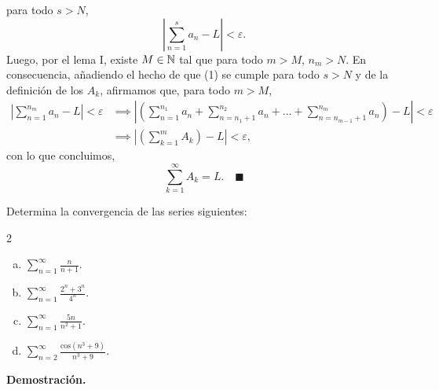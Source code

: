 \documentclass[11pt]{scrartcl}
\begin{document}
para todo $s > N$,
\[
\left|\sum_{n=1}^{s}a_n - L\right| < \varepsilon. \tag{1}
\]
Luego, por el lema I, existe $M \in \mathbb N$ tal que para todo $m > M$, $n_m > N$. En consecuencia, añadiendo el hecho de que
(1) se cumple para todo $s > N$ y de la definición de los $A_k$, afirmamos que, para todo $m > M$,
\begin{align*}
    \left|\sum_{n=1}^{n_m}a_n - L\right| < \varepsilon &\implies \left|\left(\sum_{n=1}^{n_1}a_n + \sum_{n=n_1+1}^{n_2}a_n + ... + \sum_{n=n_{m-1}+1}^{n_m}a_n\right) - L\right| < \varepsilon \\
    &\implies \left|\left(\sum_{k=1}^{m}A_k\right) - L\right| < \varepsilon,
\end{align*}
con lo que concluimos,
\[
\sum_{k=1}^{\infty}A_k = L. \quad \blacksquare
\]
\newpage
\begin{mdframed}[style=mdpurplebox, frametitle={Ejercicio 04, Tarea 10, Cálculo II}]
    Determina la convergencia de las series siguientes: 
    \begin{multicols}{2}
        \begin{enumerate}[(a)]
            \item  $\sum_{n=1}^{\infty}$$\frac{n}{n+1}$.
            \item  $\sum_{n=1}^{\infty}\frac{2^{n}+3^{n}}{4^{n}}.$
            \item  $\sum_{n=1}^{\infty}\frac{5n}{n^{2}+1}.$
            \item  $\sum_{n=2}^{\infty}\frac{\text{cos}\left(n^{3}+9\right)}{n^{3}+9}.$
        \end{enumerate}
    \end{multicols}
\end{mdframed}
\textbf{Demostración.}
\end{document}
